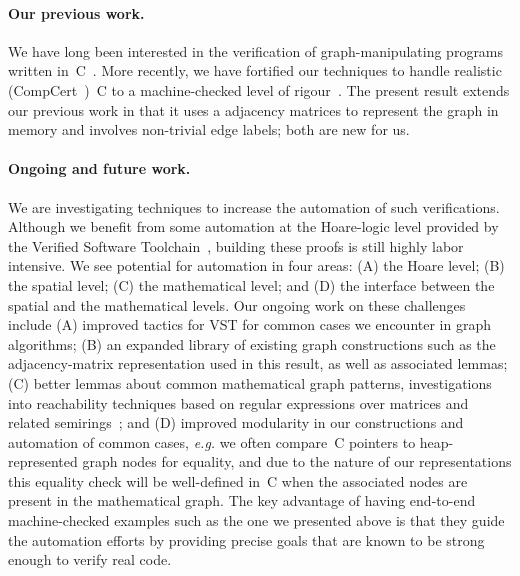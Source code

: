 \paragraph{Our previous work.} We have long been interested in
the verification of graph-manipulating programs written in~C~\cite{hobor:ramification}.
More recently, we have fortified our techniques to handle realistic (CompCert~\cite{leroy:compcert})~C
to a machine-checked level of rigour~\cite{DBLP:journals/pacmpl/WangCMH19}.  The present result extends
our previous work in that it uses a adjacency matrices to represent the graph in
memory and involves non-trivial edge labels; both are new for us.

\paragraph{Ongoing and future work.}
We are investigating techniques to increase the automation of such verifications.  Although
we benefit from some automation at the Hoare-logic level provided by the Verified Software
Toolchain~\cite{appel:programlogics}, building these proofs is still highly labor intensive.  We see potential
for automation in four areas: (A) the Hoare level; (B) the spatial level; (C) the mathematical level; and (D) the interface between the spatial and the mathematical levels.  Our ongoing work
on these challenges include (A) improved tactics for VST for common cases we encounter in graph
algorithms; (B) an expanded library of existing graph constructions such as the adjacency-matrix representation used in this result, as well as associated lemmas;
(C) better lemmas about common mathematical graph patterns, investigations into reachability techniques
based on regular expressions over matrices and related semirings~\cite{backhouse,DBLP:journals/jacm/Tarjan81a,dolan2013fun,krishna2017go}; and (D) improved modularity in our constructions and
automation of common cases, \emph{e.g.} we often compare~C pointers to heap-represented graph
nodes for equality, and due to the nature of our representations this equality check will be
well-defined in~C when the associated nodes are present in the mathematical graph.  The key
advantage of having end-to-end machine-checked examples such as the one we presented above is 
that they guide the automation efforts by providing precise goals that are known to be strong 
enough to verify real code.

